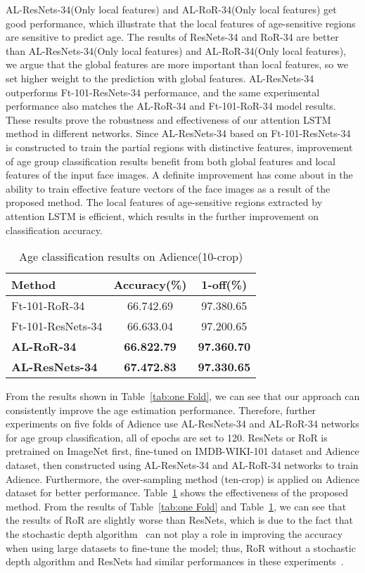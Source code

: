 \documentclass[journal]{IEEEtran}
\begin{document}
\par
AL-ResNets-34(Only local features) and AL-RoR-34(Only local features) get good performance, which illustrate that the local features of age-sensitive regions are sensitive to predict age. The results of ResNets-34 and RoR-34 are better than AL-ResNets-34(Only local features) and AL-RoR-34(Only local features), we argue that the global features are more important than local features, so we set higher weight to the prediction with global features. AL-ResNets-34 outperforms Ft-101-ResNets-34 performance, and the same experimental performance also matches the AL-RoR-34 and Ft-101-RoR-34 model results. These results prove the robustness and effectiveness of our attention LSTM method in different networks. Since AL-ResNets-34 based on Ft-101-ResNets-34 is constructed to train the partial regions with distinctive features, improvement of age group classification results benefit from both global features and local features of the input face images. A definite improvement has come about in the ability to train effective feature vectors of the face images as a result of the proposed method. The local features of age-sensitive regions extracted by attention LSTM is efficient, which results in the further improvement on classification accuracy.
\begin{table}[!t]
\renewcommand{\arraystretch}{1.3}
\caption{Age classification results on Adience(10-crop)}
\label{tab:shallow CNN}
\centering
\begin{tabular}{|l|c|c|}
\hline
Method                        &Accuracy(\%)    &1-off(\%)   \\ \hline\hline
Ft-101-RoR-34                &66.742.69   &97.380.65  \\\hline
Ft-101-ResNets-34            &66.633.04   &97.200.65  \\\hline
\textbf{AL-RoR-34}                    &\textbf{66.822.79}   &\textbf{97.360.70}   \\\hline
\textbf{AL-ResNets-34}               &\textbf{67.472.83}   &\textbf{97.330.65}\\\hline
\end{tabular}
\end{table}
\par
From the results shown in Table~\ref{tab:one Fold}, we can see that our approach can consistently improve the age estimation performance. Therefore, further experiments on five folds of Adience use AL-ResNets-34 and AL-RoR-34 networks for age group classification, all of epochs are set to 120.  ResNets or RoR is pretrained on ImageNet first, fine-tuned on IMDB-WIKI-101 dataset and Adience dataset, then constructed using AL-ResNets-34 and AL-RoR-34 networks to train Adience. Furthermore, the over-sampling method (ten-crop) is applied on Adience dataset for better performance. Table~\ref{tab:shallow CNN} shows the effectiveness of the proposed method. From the results of Table~\ref{tab:one Fold} and Table~\ref{tab:shallow CNN}, we can see that the results of RoR are slightly worse than ResNets, which is due to the fact that the stochastic depth algorithm~\cite{ref-59} can not play a role in improving the accuracy when using large datasets to fine-tune the model; thus, RoR without a stochastic depth algorithm and ResNets had similar performances in these experiments~\cite{ref-22}.
\end{document}

